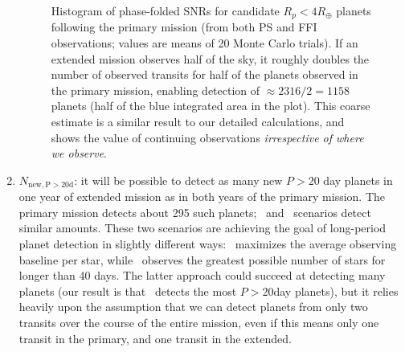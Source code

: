 \begin{enumerate}
\begin{figure}[!t]
	\caption{Histogram of phase-folded SNRs for candidate $R_p<4R_\oplus$ planets following the primary mission (from both PS and FFI observations; values are means of 20 Monte Carlo trials).
	If an extended mission observes half of the sky, it roughly doubles the number of observed transits for half of the planets observed in the primary mission, enabling detection of $\approx 2316/2 = 1158$ planets (half of the blue integrated area in the plot). This coarse estimate is a similar result to our detailed calculations, and shows the value of continuing \tesss observations \textit{irrespective of where we observe}.}
	\label{fig:snrf_histogram}
\end{figure}

	\item $N_\mathrm{new,P>20d}$: it will be possible to detect as many new $P>20$ day planets in one year of \tesss extended mission as in both years of the primary mission.
	The primary mission detects about 295 such planets; \hemis\ and \npole\ scenarios detect similar amounts.
	These two scenarios are achieving the goal of long-period planet detection in slightly different ways: %
	\npole\ maximizes the average observing baseline per star, while \hemis\ observes the greatest possible number of stars for longer than 40 days.
	The latter approach could succeed at detecting many planets (our result is that \hemis\ detects the most $P>20$day planets), but it relies heavily upon the assumption that we can detect planets from only two transits over the course of the entire mission, even if this means only one transit in the primary, and one transit in the extended.


\end{enumerate}
